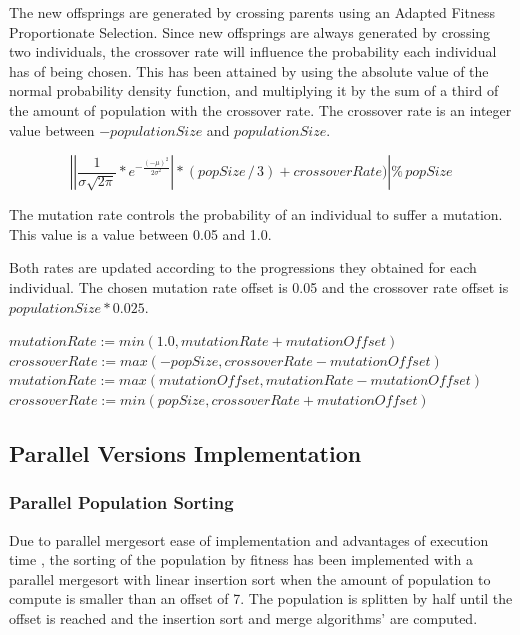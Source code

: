 \documentclass[runningheads]{llncs}
\begin{document}
The new offsprings are generated by crossing parents using an Adapted Fitness Proportionate Selection. Since new offsprings are always generated by crossing two individuals, the crossover rate will influence the probability each individual has of being chosen. This has been attained by using the absolute value of the normal probability density function, and multiplying it by the sum of a third of the amount of population with the crossover rate. The crossover rate is an integer value between \(-populationSize\) and \(populationSize\).

\[ \left |\left | \frac{1}{\sigma \sqrt{2\pi}}*e^{-\frac{(-\mu)^2}{2\sigma^2}} \right | * (popSize\,/\,3) + crossoverRate)  \right | \%  \, popSize \]	

The mutation rate controls the probability of an individual to suffer a mutation. This value is a value between 0.05 and 1.0.

Both rates are updated according to the progressions they obtained for each individual. The chosen mutation rate offset is 0.05 and the crossover rate offset is \(populationSize * 0.025\).

\begin{algorithmic}
        \State $mutationRate := min(1.0, mutationRate + mutationOffset)$
        \State $crossoverRate := max(-popSize, crossoverRate - mutationOffset)$
\EndIf
{}
        \State $mutationRate := max(mutationOffset, mutationRate - mutationOffset)$
        \State $crossoverRate := min(popSize, crossoverRate + mutationOffset)$
\EndIf
\end{algorithmic}

\subsection{Parallel Versions Implementation}
\subsubsection{Parallel Population Sorting} \label{subsubsec:parallelSort} \hfill \par
Due to parallel mergesort ease of implementation and advantages of execution time \cite{analysisMergeSort}, the sorting of the population by fitness has been implemented with a parallel mergesort with linear insertion sort when the amount of population to compute is smaller than an offset of 7. The population is splitten by half until the offset is reached and the insertion sort and merge algorithms' are computed.
\end{document}
